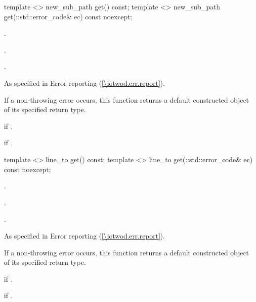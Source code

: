 \begin{itemdecl}
    template <>
    new_sub_path get() const;
    template <>
    new_sub_path get(::std::error_code& ec) const noexcept;
\end{itemdecl}
\begin{itemdescr}
	\pnum
	\preconditions
	.
	
	\pnum
	.
	
	\pnum
	\returns
	.
	
	\pnum
	\throws
	As specified in Error reporting (\ref{\iotwod.err.report}).
	
	\pnum
	\remarks
	If a non-throwing error occurs, this function returns a default constructed object of its specified return type.
	
	\pnum
	\errors
	 if .
	
	\pnum
	 if .

\end{itemdescr}

\begin{itemdecl}
    template <>
    line_to get() const;
    template <>
    line_to get(::std::error_code& ec) const noexcept;
\end{itemdecl}
\begin{itemdescr}
	\pnum
	\preconditions
	.
	
	\pnum
	.
	
	\pnum
	\returns
	.
	
	\pnum
	\throws
	As specified in Error reporting (\ref{\iotwod.err.report}).
	
	\pnum
	\remarks
	If a non-throwing error occurs, this function returns a default constructed object of its specified return type.
	
	\pnum
	\errors
	 if .
	
	\pnum
	 if .

\end{itemdescr}

